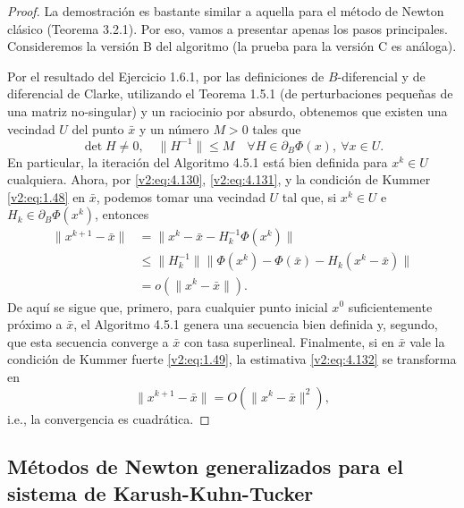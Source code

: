 \begin{proof}
    La demostración es bastante similar a aquella para el método de Newton clásico (Teorema 3.2.1). Por eso, vamos a presentar apenas los pasos principales. Consideremos la versión B del algoritmo (la prueba para la versión C es análoga).
    
    Por el resultado del Ejercicio 1.6.1, por las definiciones de $B$-diferencial y de diferencial de Clarke, utilizando el Teorema 1.5.1 (de perturbaciones pequeñas de una matriz no-singular) y un raciocinio por absurdo, obtenemos que existen una vecindad $U$ del punto $\bar{x}$ y un número $M > 0$ tales que
    \begin{equation}
        \det H \neq 0, \quad \|H^{-1}\| \le M \quad \forall H \in \partial_B \Phi(x), \ \forall x \in U.
        \label{v2:eq:4.131}
    \end{equation}
    En particular, la iteración del Algoritmo 4.5.1 está bien definida para $x^k \in U$ cualquiera.
    Ahora, por \eqref{v2:eq:4.130}, \eqref{v2:eq:4.131}, y la condición de Kummer \eqref{v2:eq:1.48} en $\bar{x}$, podemos tomar una vecindad $U$ tal que, si $x^k \in U$ e $H_k \in \partial_B \Phi(x^k)$, entonces
    \begin{align}
        \|x^{k+1} - \bar{x}\| &= \|x^k - \bar{x} - H_k^{-1}\Phi(x^k)\| \nonumber \\
        &\le \|H_k^{-1}\| \|\Phi(x^k) - \Phi(\bar{x}) - H_k(x^k - \bar{x})\| \nonumber \\
        &= o(\|x^k - \bar{x}\|). \label{v2:eq:4.132}
    \end{align}
    De aquí se sigue que, primero, para cualquier punto inicial $x^0$ suficientemente próximo a $\bar{x}$, el Algoritmo 4.5.1 genera una secuencia bien definida y, segundo, que esta secuencia converge a $\bar{x}$ con tasa superlineal.
    Finalmente, si en $\bar{x}$ vale la condición de Kummer fuerte \eqref{v2:eq:1.49}, la estimativa \eqref{v2:eq:4.132} se transforma en
    \[
        \|x^{k+1} - \bar{x}\| = O(\|x^k - \bar{x}\|^2),
    \]
    i.e., la convergencia es cuadrática.
\end{proof}

\subsection{Métodos de Newton generalizados para el sistema de Karush-Kuhn-Tucker}\label{v2:sec:4.5.2}

